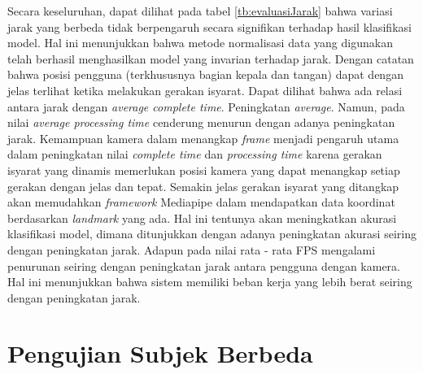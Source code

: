Secara keseluruhan, dapat dilihat pada tabel \ref{tb:evaluasiJarak} bahwa variasi jarak yang berbeda tidak berpengaruh secara signifikan terhadap hasil klasifikasi model. Hal ini menunjukkan bahwa metode normalisasi data yang digunakan telah berhasil menghasilkan model yang invarian terhadap jarak. Dengan catatan bahwa posisi pengguna (terkhususnya bagian kepala dan tangan) dapat dengan jelas terlihat ketika melakukan gerakan isyarat. Dapat dilihat bahwa ada relasi antara jarak dengan \emph{average complete time}. Peningkatan \emph{average}. Namun, pada nilai \emph{average processing time} cenderung menurun dengan adanya peningkatan jarak. Kemampuan kamera dalam menangkap \emph{frame} menjadi pengaruh utama dalam peningkatan nilai \emph{complete time} dan \emph{processing time} karena gerakan isyarat yang dinamis memerlukan posisi kamera yang dapat menangkap setiap gerakan dengan jelas dan tepat. Semakin jelas gerakan isyarat yang ditangkap akan memudahkan \emph{framework} Mediapipe dalam mendapatkan data koordinat berdasarkan \emph{landmark} yang ada. Hal ini tentunya akan meningkatkan akurasi klasifikasi model, dimana ditunjukkan dengan adanya peningkatan akurasi seiring dengan peningkatan jarak. Adapun pada nilai rata - rata FPS mengalami penurunan seiring dengan peningkatan jarak antara pengguna dengan kamera. Hal ini menunjukkan bahwa sistem memiliki beban kerja yang lebih berat seiring dengan peningkatan jarak.

\newpage
\section{Pengujian Subjek Berbeda}
\label{sec:analisissubjek}

